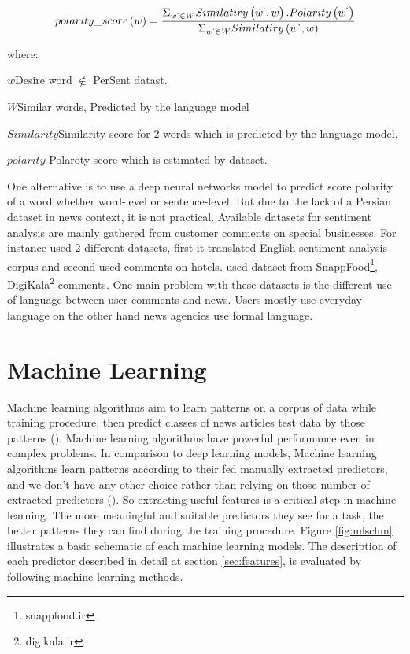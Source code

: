 \begin{equation}
	\label{eq_polar}
	polarity\_score\left(w\right) = \frac{\Sigma_{w^{`} \in W} Similatiry\left(w^{`}, w\right) . Polarity\left(w^{`}\right)}{\Sigma_{w^{`} \in W} Similatiry\left(w^{`}, w\right)}
\end{equation}

where: 
\begin{eqexpl}[25mm]
	\item{$w$}Desire word $\notin$ PerSent datast.
	\item{$W$}Similar words, Predicted by the language model
	\item{$Similarity$}Similarity score for 2 words which is predicted by the language model.
	\item{$polarity$} Polaroty score which is estimated by \cite{persent} dataset.
\end{eqexpl}

\bigbreak
One alternative is to use a deep neural networks model to predict score polarity of a word whether word-level or sentence-level. But due to the lack of a Persian dataset in news context, it is not practical. Available datasets for sentiment analysis are mainly gathered from customer comments on special businesses. For instance \cite{polar_hotel} used 2 different datasets, first it translated English sentiment analysis corpus and second used comments on hotels. \cite{polar_servic} used dataset from SnappFood\footnote{snappfood.ir}, DigiKala\footnote{digikala.ir} comments. One main problem with these datasets is the different use of language between user comments and news. Users mostly use everyday language on the other hand news agencies use formal language.

\section{Machine Learning}
Machine learning algorithms aim to learn patterns on a corpus of data while training procedure, then predict classes of news articles test data by those patterns (\cite{book_fake}). Machine learning algorithms have powerful performance even in complex problems. In comparison to deep learning models, Machine learning algorithms learn patterns according to their fed manually extracted predictors, and we don't have any other choice rather than relying on those number of extracted predictors (\cite{book_fake}). So extracting useful features  is a critical step in machine learning. The more meaningful and suitable predictors they see for a task, the better patterns they can find during the training procedure. Figure \ref{fig:mlschm} illustrates a basic schematic of each machine learning models. The description of each predictor described in detail at section \ref{sec:features}, is evaluated by following machine learning methods.   

